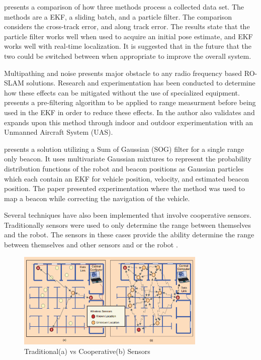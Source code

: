 \documentclass[conference]{IEEEtran}
\begin{document}
\cite{Kurth2003} presents a comparison of how three methods process a collected data set. The methods are a EKF, a sliding batch, and a particle filter. The comparison considers the cross-track error, and along track error. The results state that the particle filter works well when used to acquire an initial pose estimate, and EKF works well with real-time localization. It is suggested that in the future that the two could be switched between when appropriate to improve the overall system. 

Multipathing and noise presents major obstacle to any radio frequency based RO-SLAM solutions. Research and experimentation has been conducted to determine how these effects can be mitigated without the use of specialized equipment. \cite{Fabresse2014} presents a pre-filtering algorithm to be applied to range measurment before being used in the EKF in order to reduce these effects. In \cite{Fabresse2016} the author also validates and expands upon this method through indoor and outdoor experimentation with an Unmanned Aircraft System (UAS).  


\cite{Vallicrosa2015} presents a solution utilizing a Sum of Gaussian (SOG) filter for a single range only beacon. It uses multivariate Gaussian mixtures to represent the probability distribution functions of the robot and beacon positions as Gaussian particles which each contain an EKF for vehicle position, velocity, and estimated beacon position. The paper presented experimentation where the method was used to map a beacon while correcting the navigation of the vehicle. 

Several techniques have also been implemented that involve cooperative sensors. Traditionally sensors were used to only determine the range between themselves and the robot. The sensors in these cases provide the ability determine the range between themselves and other sensors and or the robot \cite{Patwari2005}.
\begin{figure}[h!]
	\centering
	\includegraphics[width=90mm]{coop_loc_comp_patwari.png}
	\caption{Traditional(a) vs Cooperative(b) Sensors \cite{Patwari2005}}
	\label{trad_vs_coop_sensors}
\end{figure}
\FloatBarrier
\end{document}
